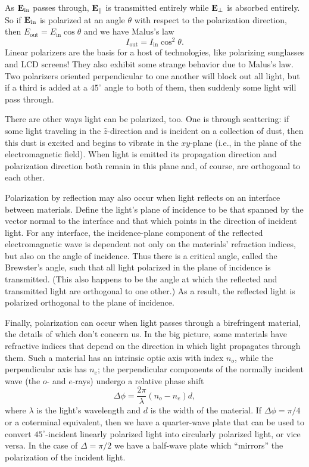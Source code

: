 \documentclass[../p051main.tex]{subfiles}
\begin{document}
As $\mathbf{E}_\textrm{in}$ passes through, $\mathbf{E}_\parallel$ is transmitted entirely while $\mathbf{E}_\perp$ is absorbed entirely.
So if $\mathbf{E}_\textrm{in}$ is polarized at an angle $\theta$ with respect to the polarization direction, then $E_\textrm{out} = E_\textrm{in} \cos \theta$ and we have Malus's law
\[ I_\textrm{out} = I_\textrm{in} \cos^2 \theta. \]
Linear polarizers are the basis for a host of technologies, like polarizing sunglasses and LCD screens!
They also exhibit some strange behavior due to Malus's law.
Two polarizers oriented perpendicular to one another will block out all light, but if a third is added at a $45^\circ$ angle to both of them, then suddenly some light will pass through.

There are other ways light can be polarized, too.
One is through scattering: if some light traveling in the $\hat z$-direction and is incident on a collection of dust, then this dust is excited and begins to vibrate in the $xy$-plane (i.e., in the plane of the electromagnetic field).
When light is emitted its propagation direction and polarization direction both remain in this plane and, of course, are orthogonal to each other.

Polarization by reflection may also occur when light reflects on an interface between materials.
Define the light's plane of incidence to be that spanned by the vector normal to the interface and that which points in the direction of incident light.
For any interface, the incidence-plane component of the reflected electromagnetic wave is dependent not only on the materials' refraction indices, but also on the angle of incidence.
Thus there is a critical angle, called the Brewster's angle, such that all light polarized in the plane of incidence is transmitted.
(This also happens to be the angle at which the reflected and transmitted light are orthogonal to one other.)
As a result, the reflected light is polarized orthogonal to the plane of incidence.

Finally, polarization can occur when light passes through a birefringent material, the details of which don't concern us.
In the big picture, some materials have refractive indices that depend on the direction in which light propagates through them.
Such a material has an intrinsic optic axis with index $n_o$, while the perpendicular axis has $n_e$; the perpendicular components of the normally incident wave (the $o$- and $e$-rays) undergo a relative phase shift
\[ \Delta \phi = \frac{2\pi}{\lambda} (n_o - n_e)d, \]
where $\lambda$ is the light's wavelength and $d$ is the width of the material.
If $\Delta \phi = \pi / 4$ or a coterminal equivalent, then we have a quarter-wave plate that can be used to convert $45^\circ$-incident linearly polarized light into circularly polarized light, or vice versa.
In the case of $\Delta = \pi / 2$ we have a half-wave plate which ``mirrors'' the polarization of the incident light.
\end{document}
